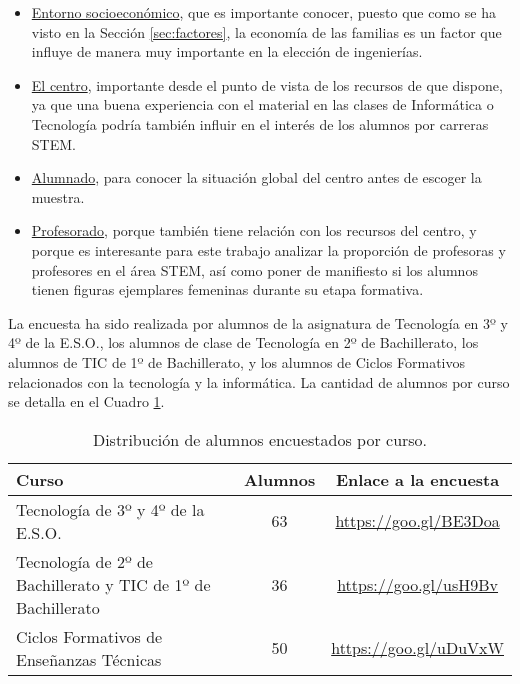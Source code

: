 \documentclass[runningheads,a4paper]{llncs}
\begin{document}
\begin{itemize}
  \item \underline{Entorno socioeconómico}, que es importante conocer, puesto que como se ha visto en la Sección \ref{sec:factores}, la economía de las familias es un factor que influye de manera muy importante en la elección de ingenierías.
  \item \underline{El centro}, importante desde el punto de vista de los recursos de que dispone, ya que una buena experiencia con el material en las clases de Informática o Tecnología podría también influir en el interés de los alumnos por carreras STEM.
  \item \underline{Alumnado}, para conocer la situación global del centro antes de escoger la muestra.
  \item \underline{Profesorado}, porque también tiene relación con los recursos del centro, y porque es interesante para este trabajo analizar la proporción de profesoras y profesores en el área STEM, así como poner de manifiesto si los alumnos tienen figuras ejemplares femeninas durante su etapa formativa.
\end{itemize}

La encuesta ha sido realizada por alumnos de la asignatura de Tecnología en 3º y 4º de la E.S.O., los alumnos de clase de Tecnología en 2º de Bachillerato, los alumnos de TIC de 1º de Bachillerato, y los alumnos de Ciclos Formativos relacionados con la tecnología y la informática. La cantidad de alumnos por curso se detalla en el Cuadro \ref{tab:muestra}.

\begin{table}
  \caption[Distribución de alumnos encuestados por curso.]{{\footnotesize Distribución de alumnos encuestados por curso.}}
  \label{tab:muestra}

  \begin{center}
    \begin{tabular}{|m{6cm}|c|c|}
    \hline
      {\small Curso} & {\small Alumnos} & {\small Enlace a la encuesta} \\ \hline
      {\small Tecnología de 3º y 4º de la E.S.O.} & {\small 63} & {\small \url{https://goo.gl/BE3Doa}} \\ \hline
      {\small Tecnología de 2º de Bachillerato y TIC de 1º de Bachillerato} & {\small 36} & {\small \url{https://goo.gl/usH9Bv}} \\ \hline
      {\small Ciclos Formativos de Enseñanzas Técnicas} & {\small 50} & {\small \url{https://goo.gl/uDuVxW}} \\ \hline
    \end{tabular}
  \end{center}
\end{table}
\end{document}
